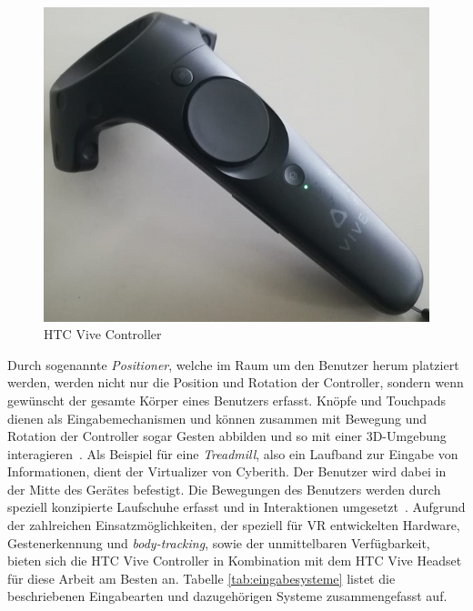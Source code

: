 \begin{figure}[h]
\captionsetup{width=.7\linewidth}
\includegraphics[scale=0.6]{Bilder/Hauptteil/vivecontroller}
\centering
\caption{HTC Vive Controller}
\label{fig:vivecontroller}
\end{figure}

Durch sogenannte \textit{Positioner}, welche im Raum um den Benutzer herum platziert werden, werden nicht nur die Position und Rotation der Controller, sondern wenn gewünscht der gesamte Körper eines Benutzers erfasst. Knöpfe und Touchpads dienen als Eingabemechanismen und können zusammen mit Bewegung und Rotation der Controller sogar Gesten abbilden und so mit einer 3D-Umgebung interagieren~\cite{wearablehtcvive}. Als Beispiel für eine \textit{Treadmill}, also ein Laufband zur Eingabe von Informationen, dient der Virtualizer von Cyberith. Der Benutzer wird dabei in der Mitte des Gerätes befestigt. Die Bewegungen des Benutzers werden durch speziell konzipierte Laufschuhe erfasst und in Interaktionen umgesetzt~\citep{virtualizer}. Aufgrund der zahlreichen Einsatzmöglichkeiten, der speziell für VR entwickelten Hardware, Gestenerkennung und \textit{body-tracking}, sowie der unmittelbaren Verfügbarkeit, bieten sich die HTC Vive Controller in Kombination mit dem HTC Vive Headset für diese Arbeit am Besten an. Tabelle \ref{tab:eingabesysteme} listet die beschriebenen Eingabearten und dazugehörigen Systeme zusammengefasst auf.

